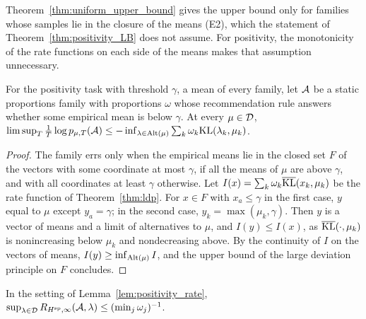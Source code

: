 Theorem~\ref{thm:uniform_upper_bound} gives the upper bound only for families whose samples lie in
the closure of the means (E2), which the statement of Theorem~\ref{thm:positivity_LB} does not
assume. For positivity, the monotonicity of the rate functions on each side of the means makes
that assumption unnecessary.

\begin{lemma}
  \label{lem:positivity_rate}
  \leanok
  For the positivity task with threshold $\gamma$, a mean of every family, let $\mathcal{A}$ be a static
  proportions family with proportions $\omega$ whose recommendation rule answers whether some
  empirical mean is below $\gamma$. At every $\mu \in \mathcal{D}$,
  $\limsup_T \frac1T \log p_{\mu, T}(\mathcal{A}) \le -\inf_{\lambda \in \mathrm{Alt}(\mu)} \sum_k \omega_k
  \mathrm{KL}(\lambda_k, \mu_k)$.
\end{lemma}

\begin{proof}
  \leanok
  The family errs only when the empirical means lie in the closed set $F$ of the vectors with some
  coordinate at most $\gamma$, if all the means of $\mu$ are above $\gamma$, and with all
  coordinates at least $\gamma$ otherwise. Let $I(x) = \sum_k \omega_k \overline{\mathrm{KL}}(x_k, \mu_k)$
  be the rate function of Theorem~\ref{thm:ldp}. For $x \in F$ with $x_a \le \gamma$ in the first
  case, $y$ equal to $\mu$ except $y_a = \gamma$; in the second case, $y_k = \max(\mu_k, \gamma)$.
  Then $y$ is a vector of means and a limit of alternatives to $\mu$, and $I(y) \le I(x)$, as
  $\overline{\mathrm{KL}}(\cdot, \mu_k)$ is nonincreasing below $\mu_k$ and nondecreasing above. By the
  continuity of $I$ on the vectors of means, $I(y) \ge \inf_{\mathrm{Alt}(\mu)} I$, and the upper bound of
  the large deviation principle on $F$ concludes.
\end{proof}

\begin{lemma}
  \label{lem:positivity_upper}
  \leanok
  In the setting of Lemma~\ref{lem:positivity_rate},
  $\sup_{\lambda \in \mathcal{D}} R_{H^{\mathrm{sp}}, \infty}(\mathcal{A}, \lambda) \le (\min_j \omega_j)^{-1}$.
\end{lemma}

